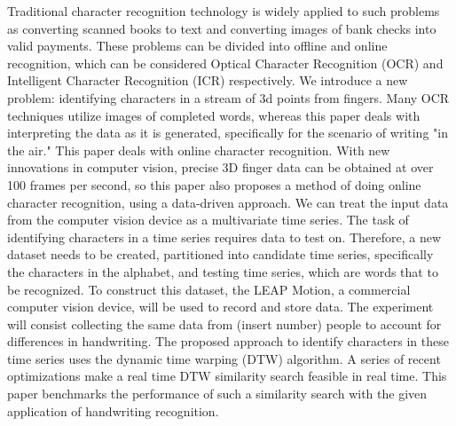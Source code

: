 Traditional character recognition technology is widely applied to such problems as converting scanned books to text and converting images of bank checks into valid payments. These problems can be divided into offline and online recognition, which can be considered Optical Character Recognition (OCR) and Intelligent Character Recognition (ICR) respectively. 
We introduce a new problem: identifying characters in a stream of 3d points from fingers. Many OCR techniques utilize images of completed words, whereas this paper deals with interpreting the data as it is generated, specifically for the scenario of writing "in the air."  
This paper deals with online character recognition. With new innovations in computer vision, precise 3D finger data can be obtained at over 100 frames per second, so this paper also proposes a method of doing online character recognition, using a data-driven approach. We can treat the input data from the computer vision device as a multivariate time series.
The task of identifying characters in a time series requires data to test on. Therefore, a new dataset needs to be created, partitioned into candidate time series, specifically the characters in the alphabet, and testing time series, which are words that to be recognized. To construct this dataset, the LEAP Motion, a commercial computer vision device, will be used to record and store data. The experiment will consist collecting the same data from  (insert number) people to account for differences in handwriting.
The proposed approach to identify characters in these time series uses the dynamic time warping (DTW) algorithm. A series of recent optimizations make a real time DTW similarity search feasible in real time. This paper benchmarks the performance of such a similarity search with the given application of handwriting recognition.
